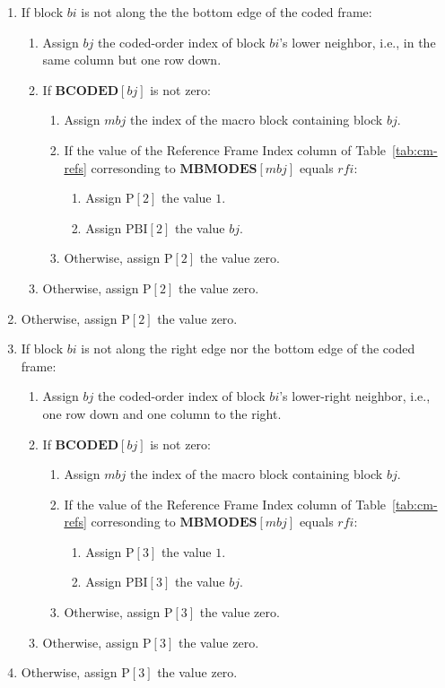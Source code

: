 \documentclass[9pt,letterpaper]{book}
\newcommand{\idx}[1]{{\ensuremath{\mathit{#1}}}}
\newcommand{\bi}{\idx{bi}}
\newcommand{\bj}{\idx{bj}}
\newcommand{\mbj}{\idx{mbj}}
\newcommand{\rfi}{\idx{rfi}}
\newcommand{\bitvar}[1]{\ensuremath{\mathbf{\bm{#1}}}}
\newcommand{\locvar}[1]{\ensuremath{\mathrm{#1}}}
\numberwithin{equation}{chapter}
\numberwithin{figure}{chapter}
\numberwithin{table}{chapter}
\begin{document}
\begin{enumerate}
\item
If block \bitvar{\bi} is not along the the bottom edge of the coded frame:
\begin{enumerate}
\item
Assign \locvar{\bj} the coded-order index of block \bitvar{\bi}'s lower
 neighbor, i.e., in the same column but one row down.
\item
If $\bitvar{BCODED}[\bj]$ is not zero:
\begin{enumerate}
\item
Assign \locvar{\mbj} the index of the macro block containing block
 \locvar{\bj}.
\item
If the value of the Reference Frame Index column of Table~\ref{tab:cm-refs}
 corresonding to $\bitvar{MBMODES}[\locvar{\mbj}]$ equals \locvar{\rfi}:
\begin{enumerate}
\item
Assign $\locvar{P}[2]$ the value $1$.
\item
Assign $\locvar{PBI}[2]$ the value \locvar{\bj}.
\end{enumerate}
\item
Otherwise, assign $\locvar{P}[2]$ the value zero.
\end{enumerate}
\item
Otherwise, assign $\locvar{P}[2]$ the value zero.
\end{enumerate}
\item
Otherwise, assign $\locvar{P}[2]$ the value zero.

\item
If block \bitvar{\bi} is not along the right edge nor the bottom edge of the
 coded frame:
\begin{enumerate}
\item
Assign \locvar{\bj} the coded-order index of block \bitvar{\bi}'s lower-right
 neighbor, i.e., one row down and one column to the right.
\item
If $\bitvar{BCODED}[\bj]$ is not zero:
\begin{enumerate}
\item
Assign \locvar{\mbj} the index of the macro block containing block
 \locvar{\bj}.
\item
If the value of the Reference Frame Index column of Table~\ref{tab:cm-refs}
 corresonding to $\bitvar{MBMODES}[\locvar{\mbj}]$ equals \locvar{\rfi}:
\begin{enumerate}
\item
Assign $\locvar{P}[3]$ the value $1$.
\item
Assign $\locvar{PBI}[3]$ the value \locvar{\bj}.
\end{enumerate}
\item
Otherwise, assign $\locvar{P}[3]$ the value zero.
\end{enumerate}
\item
Otherwise, assign $\locvar{P}[3]$ the value zero.
\end{enumerate}
\item
Otherwise, assign $\locvar{P}[3]$ the value zero.


\end{enumerate}
\end{document}
